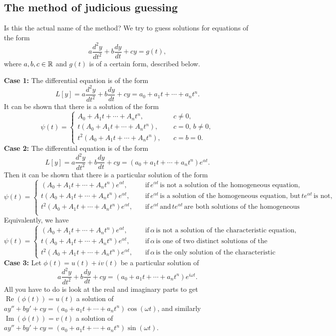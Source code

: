 \subsection{The method of judicious guessing}
Is this the actual name of the method? We try to guess solutions for equations of the form 
\begin{equation}\label{ncsode}
    a \frac{d^2y}{dt^2}+b \frac{dy}{dt}+cy=g(t),
\end{equation}
where $a,b,c\in \mathbb{R}$ and $g(t)$ is of a certain form, described below.

\vspace{0.25cm}
\noindent\textbf{Case 1:} The differential equation is of the form \[
    L[y]=a \frac{d^2y}{dt^2}+b \frac{dy}{dt}+cy=a_0+a_1t+\cdots +a_nt^n.
\] It can be shown that there is a solution of the form \[
\psi(t)=
\begin{cases}
    A_0+A_1t+\cdots+A_nt^n,&\quad c\neq 0,\\
    t(A_0+A_1t+\cdots+A_nt^n),&\quad c=0,\,b\neq 0,\\
    t^2(A_0+A_1t+\cdots+A_nt^n),&\quad c=b=0.
\end{cases}
\] 
\noindent\textbf{Case 2:} The differential equation is of the form \[
    L[y]=a  \frac{d^2y}{dt^2}+b \frac{dy}{dt}+cy=(a_0+a_1t+\cdots + a_nt^n)e^{\alpha t}.
\] Then it can be shown that there is a particular solution of the form \[
\psi(t)=
\begin{cases}
    (A_0+A_1t+\cdots+A_nt^n)e^{\alpha t},&\quad \text{if}\, e^{\alpha t}\, \text{is not a solution of the homogeneous equation,}\\
    t(A_0+A_1t+\cdots+A_nt^n)e^{\alpha t},&\quad \text{if}\, e^{\alpha t}\, \text{is a solution of the homogeneous equation, but}\,te^{\alpha t}\,\text{is not,}\\
    t^2(A_0+A_1t+\cdots+A_nt^n)e^{\alpha t},&\quad \text{if}\, e^{\alpha t}\, \text{and}\,te^{\alpha t}\,\text{are both solutions of the homogeneous equation.}\\
\end{cases}
\] Equivalently, we have\[
\psi(t)=
\begin{cases}
    (A_0+A_1t+\cdots+A_nt^n)e^{\alpha t},&\quad \text{if}\, \alpha\, \text{is not a solution of the characteristic equation,}\\
    t(A_0+A_1t+\cdots+A_nt^n)e^{\alpha t},&\quad \text{if}\, \alpha \, \text{is one of two distinct solutions of the characteristic,}\\
    t^2(A_0+A_1t+\cdots+A_nt^n)e^{\alpha t},&\quad \text{if}\, \alpha\, \text{is the only solution of the characteristic equation.}
\end{cases}
\] 
\noindent\textbf{Case 3:} Let $\phi(t)=u(t)+iv(t)$ be a particular solution of  \[
    a \frac{d^2y}{dt^2}+b \frac{dy}{dt}+cy=(a_0+a_1t+\cdots+a_nt^n)e^{i\omega t}.
\] All you have to do is look at the real and imaginary parts to get $\operatorname{Re}(\phi(t))=u(t)$ a solution of $ay''+by'+cy=(a_0+a_1t+\cdots+a_nt^n)\cos(\omega t)$, and similarly $\operatorname{Im}(\phi(t))=v(t)$ a solution of $ay''+by'+cy=(a_0+a_1t+\cdots+a_nt^n)\sin(\omega t)$.




